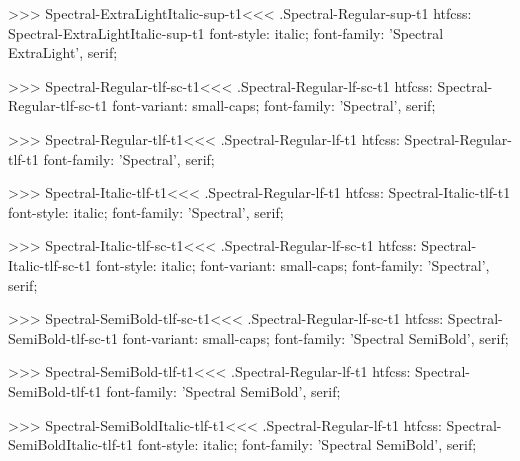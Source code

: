 >>>
\<Spectral-ExtraLightItalic-sup-t1\><<<
.Spectral-Regular-sup-t1
htfcss:  Spectral-ExtraLightItalic-sup-t1  font-style: italic; font-family: 'Spectral ExtraLight', serif;

>>>
\<Spectral-Regular-tlf-sc-t1\><<<
.Spectral-Regular-lf-sc-t1
htfcss:  Spectral-Regular-tlf-sc-t1  font-variant: small-caps; font-family: 'Spectral', serif;

>>>
\<Spectral-Regular-tlf-t1\><<<
.Spectral-Regular-lf-t1
htfcss:  Spectral-Regular-tlf-t1  font-family: 'Spectral', serif;

>>>
\<Spectral-Italic-tlf-t1\><<<
.Spectral-Regular-lf-t1
htfcss:  Spectral-Italic-tlf-t1  font-style: italic; font-family: 'Spectral', serif;

>>>
\<Spectral-Italic-tlf-sc-t1\><<<
.Spectral-Regular-lf-sc-t1
htfcss:  Spectral-Italic-tlf-sc-t1  font-style: italic; font-variant: small-caps; font-family: 'Spectral', serif;

>>>
\<Spectral-SemiBold-tlf-sc-t1\><<<
.Spectral-Regular-lf-sc-t1
htfcss:  Spectral-SemiBold-tlf-sc-t1  font-variant: small-caps; font-family: 'Spectral SemiBold', serif;

>>>
\<Spectral-SemiBold-tlf-t1\><<<
.Spectral-Regular-lf-t1
htfcss:  Spectral-SemiBold-tlf-t1  font-family: 'Spectral SemiBold', serif;

>>>
\<Spectral-SemiBoldItalic-tlf-t1\><<<
.Spectral-Regular-lf-t1
htfcss:  Spectral-SemiBoldItalic-tlf-t1  font-style: italic; font-family: 'Spectral SemiBold', serif;

